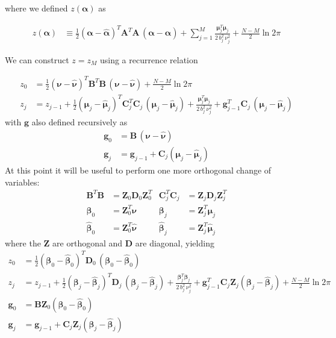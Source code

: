 \documentclass{amsart}
\newcommand{\bm}[1]{\ensuremath{\boldsymbol{#1}}}
\begin{document}
where we defined $z(\bm{\alpha})$ as

\begin{align}
  z(\bm{\alpha}) &\equiv 
  \frac{1}{2}(\bm{\alpha}-\hat{\bm{\alpha}})^T\! 
  \bm{A}^T\!\bm{A}\,(\bm{\alpha}-\hat{\bm{\alpha}})
  + \sum_{j=1}^M \frac{\bm{\mu}_j^T\bm{\mu}_j}{2\,b_j^2\,\nu_j^2} 
  + \frac{N-M}{2}\ln 2\pi
\end{align}

We can construct $z = z_M$ using a recurrence relation

\begin{align}
  z_0 &=
  \frac{1}{2}(\bm{\nu}-\hat{\bm{\nu}})^T\bm{B}^T\!\bm{B}\,(\bm{\nu}-\hat{\bm{\nu}})
  + \frac{N-M}{2}\ln 2\pi\\
  z_j &= z_{j-1} + 
  \frac{1}{2}(\bm{\mu}_j-\hat{\bm{\mu}}_j)^T\bm{C}_j^T\!\bm{C}_j\,(\bm{\mu}_j-\hat{\bm{\mu}}_j)
  + \frac{\bm{\mu}_j^T\bm{\mu}_j}{2\,b_j^2\,\nu_j^2}
  + \bm{g}_{j-1}^T \bm{C}_j\,(\bm{\mu}_j-\hat{\bm{\mu}}_j)
\end{align}
with $\bm{g}$ also defined recursively as
\begin{align}
  \bm{g}_0 &= \bm{B}\,(\bm{\nu}-\hat{\bm{\nu}})\\
  \bm{g}_j &= \bm{g}_{j-1} + \bm{C}_j (\bm{\mu}_j-\hat{\bm{\mu}}_j)
\end{align}
At this point it will be useful to perform one more orthogonal change
of variables:
\begin{align}
  \bm{B}^T\!\bm{B} &= \bm{Z}_0\bm{D}_0\bm{Z}_0^T &
  \bm{C}_j^T\!\bm{C}_j &= \bm{Z}_j\bm{D}_j\bm{Z}_j^T \\
  \bm{\beta}_0 &= \bm{Z}_0^T \bm{\nu} &
  \bm{\beta}_j &= \bm{Z}_j^T \bm{\mu}_j \\
  \hat{\bm{\beta}}_0 &= \bm{Z}_0^T \hat{\bm{\nu}} &
  \hat{\bm{\beta}}_j &= \bm{Z}_j^T \hat{\bm{\mu}}_j
\end{align}
where the $\bm{Z}$ are orthogonal and $\bm{D}$ are diagonal, yielding
\begin{align}
  z_0 &=
  \frac{1}{2}(\bm{\beta}_0-\hat{\bm{\beta}}_0)^T\bm{D}_0\,(\bm{\beta}_0-\hat{\bm{\beta}}_0) \\
  z_j &= z_{j-1} + 
  \frac{1}{2}(\bm{\beta}_j-\hat{\bm{\beta}}_j)^T\bm{D}_j\,(\bm{\beta}_j-\hat{\bm{\beta}}_j)
  + \frac{\bm{\beta}_j^T\bm{\beta}_j}{2\,b_j^2\,\nu_j^2}
  + \bm{g}_{j-1}^T \bm{C}_j\bm{Z}_j(\bm{\beta}_j-\hat{\bm{\beta}}_j)
  + \frac{N-M}{2}\ln 2\pi \\
  \bm{g}_0 &= \bm{B}\bm{Z}_0(\bm{\beta}_0-\hat{\bm{\beta}}_0)\\
  \bm{g}_j &= \bm{g}_{j-1} + \bm{C}_j\bm{Z}_j(\bm{\beta}_j-\hat{\bm{\beta}}_j)
\end{align}
\end{document}
